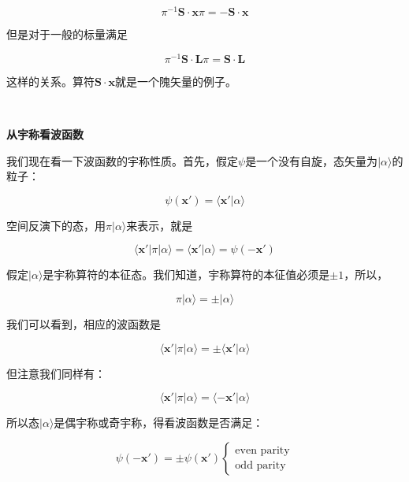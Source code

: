 \documentclass[UTF8,twoside]{ctexart}
\begin{document}
\begin{equation}
\pi^{-1} \bm{S}\cdot\bm{x}\pi = -\bm{S}\cdot\bm{x}
\end{equation}

\noindent 但是对于一般的标量满足

\begin{equation}
\pi^{-1} \bm{S}\cdot\bm{L}\pi = \bm{S}\cdot\bm{L}
\end{equation}


这样的关系。算符$\bm{S}\cdot\bm{x}$就是一个隗矢量的例子。

\ 

\noindent \textbf{从宇称看波函数}

\noindent 我们现在看一下波函数的宇称性质。首先，假定$\psi$是一个没有自旋，态矢量为$|\alpha\rangle$的粒子：

\begin{equation}
\psi(\bm{x}') = \langle\bm{x}'|\alpha\rangle
\end{equation}

\noindent 空间反演下的态，用$\pi|\alpha\rangle$来表示，就是

\begin{equation}
\langle\bm{x}'|\pi|\alpha\rangle = \langle\bm{x}'|\alpha\rangle = \psi(-\bm{x}')
\end{equation}

假定$|\alpha\rangle$是宇称算符的本征态。我们知道，宇称算符的本征值必须是$\pm 1$，所以，

\begin{equation}
\pi|\alpha\rangle = \pm|\alpha\rangle
\end{equation}

\noindent 我们可以看到，相应的波函数是

\begin{equation}
\langle\bm{x}'|\pi|\alpha\rangle = \pm \langle\bm{x'}|\alpha\rangle
\end{equation}

\noindent 但注意我们同样有：

\begin{equation} \label{4.2.23}
\langle\bm{x}'|\pi|\alpha\rangle = \langle-\bm{x}'|\alpha\rangle
\end{equation}

\noindent 所以态$|\alpha\rangle$是偶宇称或奇宇称，得看波函数是否满足：

\begin{equation} \label{4.2.24}
\psi(-\bm{x}') = \pm\psi(\bm{x}')
\begin{cases}
\text{even parity}\\
\text{odd parity}
\end{cases}
\end{equation}
\end{document}
